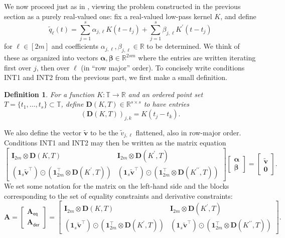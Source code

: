 \documentclass[11pt]{article}
\newcommand{\RR}{\mathbb{R}}
\newcommand{\TT}{\mathbb{T}}
\newcommand{\one}{\bm{1}}
\newcommand{\eq}{\mathsf{eq}}
\newcommand{\der}{\mathsf{der}}
\newcommand{\balpha}{\bm \alpha}
\newcommand{\bbeta}{\bm \beta}
\newcommand{\bA}{\bm A}
\newcommand{\bD}{\bm D}
\newcommand{\bv}{\bm v}
\newtheorem{definition}{Definition}
\begin{document}
We now proceed just as in \cite{fernandez2016super}, viewing the problem constructed in the previous section as a purely real-valued one: fix a real-valued low-pass kernel $K$, and define
\begin{equation}
    \tilde{q}_{\ell}(t) = \sum_{j = 1}^s \alpha_{j, \ell}K(t - t_j) + \sum_{j = 1}^s \beta_{j, \ell} K^\prime(t - t_j)
    \label{eq:interpolant-def}
\end{equation}
for $\ell \in [2m]$ and coefficients $\alpha_{j, \ell}, \beta_{j, \ell} \in \RR$ to be determined.
We think of these as organized into vectors $\balpha, \bbeta \in \RR^{2sm}$ where the entries are written iterating first over $j$, then over $\ell$ (in ``row major'' order).
To concisely write conditions \textsf{INT1} and \textsf{INT2} from the previous part, we first make a small definition.
\begin{definition}
    For a function $K: \TT \to \RR$ and an ordered point set $T = \{t_1, \dots, t_s\} \subset \TT$, define $\bD(K, T) \in \RR^{s \times s}$ to have entries
    \begin{equation}
        (\bD(K, T))_{j, k} = K(t_j - t_k).
    \end{equation}
\end{definition}
We also define the vector $\tilde{\bv}$ to be the $\tilde{v}_{j, \ell}$ flattened, also in row-major order.
Conditions \textsf{INT1} and \textsf{INT2} may then be written as the matrix equation
\[ \left[ \begin{array}{cc} \bm I_{2m} \otimes \bD(K, T) & \bm I_{2m} \otimes \bD(K^\prime, T) \\ (\one_s\tilde{\bv}^\top) \odot (\one_{2m}^\top \otimes \bD(K^\prime, T)) & (\one_s \tilde{\bv}^\top) \odot (\one_{2m}^\top \otimes \bD(K^{\prime\prime}, T)) \end{array}\right]\left[\begin{array}{c}\balpha \\ \bbeta \end{array}\right] = \left[\begin{array}{cc} \tilde{\bv} \\ \bm 0 \end{array}\right]. \]
We set some notation for the matrix on the left-hand side and the blocks corresponding to the set of equality constraints and derivative constraints:
\[ \bA = \left[\begin{array}{c} \bA_{\eq} \\ \bA_{\der} \end{array}\right] = \left[ \begin{array}{cc} \bm I_{2m} \otimes \bD(K, T) & \bm I_{2m} \otimes \bD(K^\prime, T) \\ (\one_s\tilde{\bv}^\top) \odot (\one_{2m}^\top \otimes \bD(K^\prime, T)) & (\one_s \tilde{\bv}^\top) \odot (\one_{2m}^\top \otimes \bD(K^{\prime\prime}, T)) \end{array}\right]. \]
\end{document}

